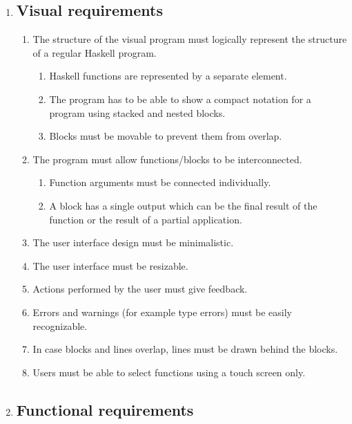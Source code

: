 \begin{enumerate}
\item \subsection*{Visual requirements} 

\begin{enumerate}
	\item The structure of the visual program must logically represent the structure of a regular Haskell program.
		\begin{enumerate}
			\item Haskell functions are represented by a separate element.
			\item The program has to be able to show a compact notation for a program using stacked and nested blocks.
			\item Blocks must be movable to prevent them from overlap.
		\end{enumerate}
	\item The program must allow functions/blocks to be interconnected.
		\begin{enumerate}
			\item Function arguments must be connected individually.
			\item A block has a single output which can be the final result of the function or the result of a partial application.
		\end{enumerate}
	\item The user interface design must be minimalistic.
	\item The user interface must be resizable.
	\item Actions performed by the user must give feedback.
	\item Errors and warnings (for example type errors) must be easily recognizable.
	\item In case blocks and lines overlap, lines must be drawn behind the blocks.
	\item Users must be able to select functions using a touch screen only.
\end{enumerate}

\item \subsection*{Functional requirements} 


\end{enumerate}
